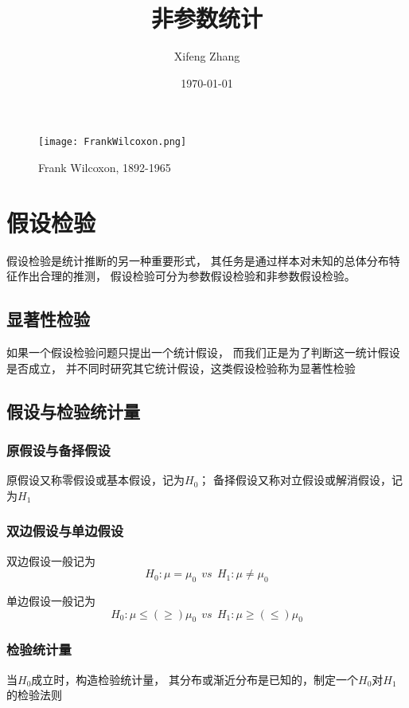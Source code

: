 \documentclass[UTF8]{ctexart}
\title{\kaishu 非参数统计}	%
\author{Xifeng Zhang}	%
\date{\heiti \today}	%
\numberwithin{equation}{section}
\begin{document}
\maketitle

\begin{figure}[h]
    \centering
    \texttt{[image: FrankWilcoxon.png]}
    \caption*{Frank Wilcoxon, 1892-1965}
\end{figure}
\thispagestyle{empty}

\clearpage
\tableofcontents

\clearpage
\setcounter{page}{1}

\section{假设检验}
假设检验是统计推断的另一种重要形式，
其任务是通过样本对未知的总体分布特征作出合理的推测，
假设检验可分为参数假设检验和非参数假设检验。

\subsection{显著性检验}
如果一个假设检验问题只提出一个统计假设，
而我们正是为了判断这一统计假设是否成立，
并不同时研究其它统计假设，这类假设检验称为显著性检验

\subsection{假设与检验统计量}
\subsubsection{原假设与备择假设}
原假设又称零假设或基本假设，记为$H_0$；
备择假设又称对立假设或解消假设，记为$H_1$

\subsubsection{双边假设与单边假设}
双边假设一般记为
\begin{equation}
    H_0: \mu = \mu_0 ~~ vs ~~ H_1: \mu \neq \mu_0
    \nonumber
\end{equation}

单边假设一般记为
\begin{equation}
    H_0: \mu \leq(\geq) \mu_0 ~~ vs ~~ H_1: \mu \geq(\leq) \mu_0
    \nonumber
\end{equation}

\subsubsection{检验统计量}
当$H_0$成立时，构造检验统计量，
其分布或渐近分布是已知的，制定一个$H_0$对$H_1$的检验法则
\end{document}
